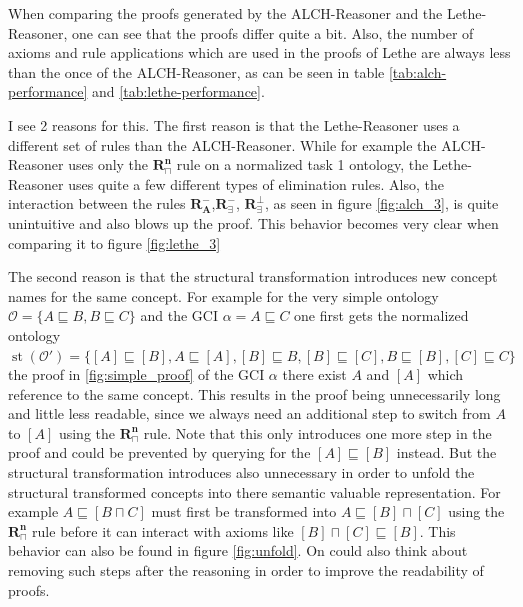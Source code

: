\documentclass[titlepage]{article}
\DeclareMathOperator{\st}{st}
\begin{document}
When comparing the proofs generated by the ALCH-Reasoner and the Lethe-Reasoner, one can see that the 
proofs differ quite a bit. Also, the number of axioms and rule applications which are used in the proofs
of Lethe are always less than the once of the ALCH-Reasoner, as can be seen in table 
\ref{tab:alch-performance} and \ref{tab:lethe-performance}. 

I see 2 reasons for this. The first reason is that the Lethe-Reasoner uses a different
set of rules than the ALCH-Reasoner.
While for example the ALCH-Reasoner uses only the $\mathbf{R^{n}_{\sqcap}}$ rule
on a normalized task 1 ontology, the Lethe-Reasoner uses quite a few different types of elimination rules.
Also, the interaction between the rules $\mathbf{R^{-}_A}$,$\mathbf{R^{-}_{\exists}}$, $\mathbf{R^\bot_{\exists}}$,
as seen in figure \ref{fig:alch_3}, is quite unintuitive and also blows up the proof. This behavior 
becomes very clear when comparing it to figure \ref{fig:lethe_3}

The second reason is that the structural transformation introduces new concept names for the same concept.
For example for the very simple ontology $ \mathcal{O} = \{ A \sqsubseteq B,  B  \sqsubseteq C \}$ and the GCI $\alpha = A \sqsubseteq C$
one first gets the normalized ontology 
$ \st(\mathcal{O'}) = \{ 
  [A] \sqsubseteq [B], A \sqsubseteq [A], [B] \sqsubseteq B,
  [B] \sqsubseteq [C], B \sqsubseteq [B], [C] \sqsubseteq C \}
$
the proof in \ref{fig:simple_proof} of the GCI $\alpha$ there exist $A$ and $[A]$ which reference to the same concept.
This results in the proof being unnecessarily long and little less readable, since 
we always need an additional step to switch from $A$ to $[A]$ using the $\mathbf{R^{n}_{\sqcap}}$ rule.
Note that this only introduces one more step in the proof and could be prevented by querying for the $[A] \sqsubseteq [B]$
instead.
But the structural transformation introduces also unnecessary in order to unfold the structural transformed
concepts into there semantic valuable representation. For example $A \sqsubseteq [B \sqcap C]$
must first be transformed into $A \sqsubseteq [B] \sqcap [C]$ using the $\mathbf{R^{n}_{\sqcap}}$ rule
before it can interact with axioms like $[B] \sqcap [C] \sqsubseteq [B]$.
This behavior can also be found in figure \ref{fig:unfold}. On could also think about removing such steps
after the reasoning in order to improve the readability of proofs.


\end{document}
